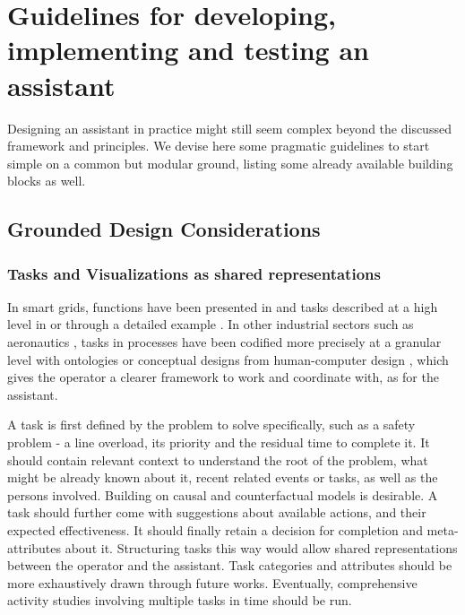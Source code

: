 \documentclass{IOS-Book-Article}
\begin{document}
\section{Guidelines for developing, implementing and testing an assistant}
\label{sec:guidelines}
Designing an assistant in practice might still seem complex beyond the discussed framework and principles. We devise here some pragmatic guidelines to start simple on a common but modular ground, listing some already available building blocks as well.

\subsection{Grounded Design Considerations}
\vspace{-0.2cm}
\subsubsection{Tasks and Visualizations as shared representations}
In smart grids, functions have been presented in \cite{Li2010_vision, gopstein2021nist,marot2022perspectives} and  tasks described at a high level in \cite{prostejovsky2019future,abram2021flexibility} or through a detailed example \cite{EPRI2021}. In other industrial sectors such as aeronautics \cite{boy2017human}, tasks in processes have been codified more precisely at a granular level
with ontologies \cite{reiss2006using} or conceptual designs from human-computer design \cite{boy2017human}, which gives the operator a clearer framework to work and coordinate with, as for the assistant. %

A task is first defined by the problem to solve specifically, such as a safety problem - a line overload, its priority and the residual time to complete it. It should contain relevant context to understand the root of the problem, what might be already known about it, recent related events or tasks, as well as the persons involved. Building on causal and counterfactual models \cite{pearl2018book} is desirable. A task should further come with suggestions about available actions, and their expected effectiveness. It should finally retain a decision for completion and meta-attributes about it. Structuring tasks this way would allow shared representations \cite{heer2019agency} between the operator and the assistant. Task categories and attributes should be more exhaustively drawn through future works. Eventually, comprehensive activity studies involving multiple tasks in time \cite{boy2017human} should be run.
\end{document}
